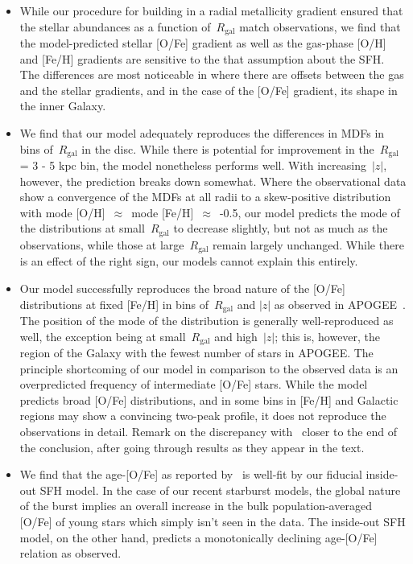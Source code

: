 \documentclass[fleqn, usenatbib]{mnras}
\begin{document}
\begin{itemize}
	\item While our procedure for building in a radial metallicity gradient 
	ensured that the stellar abundances as a function of~$R_\text{gal}$ match 
	observations, we find that the model-predicted stellar [O/Fe] gradient as 
	well as the gas-phase [O/H] and [Fe/H] gradients are sensitive to the 
	that assumption about the SFH. The differences are most noticeable in where 
	there are offsets between the gas and the stellar gradients, and in the 
	case of the [O/Fe] gradient, its shape in the inner Galaxy. 

	\item We find that our model adequately reproduces the differences in MDFs 
	in bins of~$R_\text{gal}$ in the disc. While there is potential for 
	improvement in the~$R_\text{gal}$ = 3 - 5 kpc bin, the model nonetheless 
	performs well. With increasing~$\left|z\right|$, however, the prediction 
	breaks down somewhat. Where the observational data show a convergence of 
	the MDFs at all radii to a skew-positive distribution with mode 
	[O/H]~$\approx$~mode [Fe/H]~$\approx$~-0.5, our model predicts the mode of 
	the distributions at small~$R_\text{gal}$ to decrease slightly, but not as 
	much as the observations, while those at large~$R_\text{gal}$ remain 
	largely unchanged. While there is an effect of the right sign, our models 
	cannot explain this entirely. 

	\item Our model successfully reproduces the broad nature of the [O/Fe] 
	distributions at fixed [Fe/H] in bins of~$R_\text{gal}$ and 
	$\left|z\right|$ as observed in APOGEE~\citep{Hayden2015}. The 
	position of the mode of the distribution is generally well-reproduced as 
	well, the exception being at small~$R_\text{gal}$ and high~$\left|z\right|$; 
	this is, however, the region of the Galaxy with the fewest number of stars 
	in APOGEE. The principle shortcoming of our model in comparison to the 
	observed data is an overpredicted frequency of intermediate [O/Fe] stars. 
	While the model predicts broad [O/Fe] distributions, and in some bins in 
	[Fe/H] and Galactic regions may show a convincing two-peak profile, it 
	does not reproduce the observations in detail. {\color{red} Remark on the 
	discrepancy with~\citet{Sharma2020} closer to the end of the conclusion, 
	after going through results as they appear in the text.} 

	\item We find that the age-[O/Fe] as reported by~\citet{Feuillet2019} is 
	well-fit by our fiducial inside-out SFH model. In the case of our recent 
	starburst models, the global nature of the burst implies an overall 
	increase in the bulk population-averaged [O/Fe] of young stars which 
	simply isn't seen in the data. The inside-out SFH model, on the other hand, 
	predicts a monotonically declining age-[O/Fe] relation as observed. 


\end{itemize}
\end{document}
